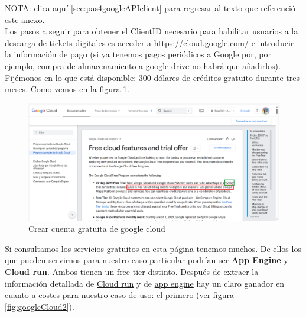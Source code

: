 \documentclass[a4paper,12pt]{report}
\begin{document}
		NOTA: clica aquí \ref{sec:pas4googleAPIclient} para regresar al texto que referenció este anexo.\\
		
	
		Los pasos a seguir para obtener el ClientID necesario para habilitar usuarios a la descarga de tickets digitales es acceder a \href{https://cloud.google.com}{https://cloud.google.com/} e introducir la información de pago (si ya tenemos pagos periódicos a Google por, por ejemplo, compra de almacenamiento a google drive no habrá que añadirlos). Fijémonos en lo que está disponible: 300 dólares de créditos gratuito durante tres meses. Como vemos en la figura \ref{fig:googlecloud1}.
		
		\FloatBarrier
		\begin{figure}[H]
			\centering
			\caption{Crear cuenta gratuita de google cloud}
			\label{fig:googlecloud1}
			\includegraphics[width=1\linewidth]{img/googleCloud1.png}
		\end{figure}
		\FloatBarrier
		
		
		Si consultamos los servicios gratuitos en \href{https://cloud.google.com/free/docs/free-cloud-features?authuser=2#free-tier-usage-limits}{esta página} tenemos muchos. De ellos los que pueden servirnos para nuestro caso particular podrían ser \textbf{App Engine} y \textbf{Cloud run}. Ambos tienen un free tier distinto. Después de extraer la información detallada de \href{https://cloud.google.com/run/docs/overview/what-is-cloud-run?authuser=2&hl=es-419}{Cloud run} y de \href{https://cloud.google.com/appengine/docs/an-overview-of-app-engine?authuser=2&hl=es-419}{app engine} hay un claro ganador en cuanto a costes para nuestro caso de uso: el primero (ver figura \ref{fig:googleCloud2}).
		
\end{document}
